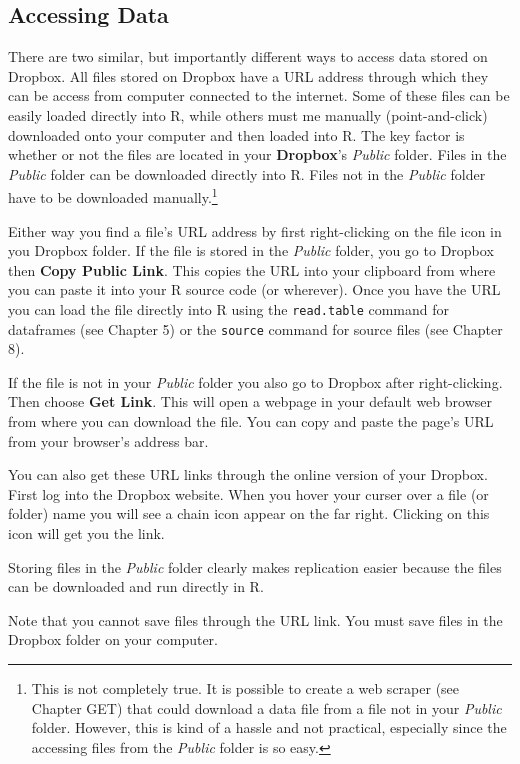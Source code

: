 \documentclass[ChapterTOCs,krantz1]{krantz}\usepackage{graphicx, color}
\begin{document}
{{\subsection{Accessing Data}

There are two similar, but importantly different ways to access data
stored on Dropbox. All files stored on Dropbox have a
URL address through which they can be access from computer connected to
the internet. Some of these files can be easily loaded directly into
R, while others must me manually (point-and-click) downloaded
onto your computer and then loaded into R. The key factor is
whether or not the files are located in your \textbf{Dropbox}'s
\emph{Public} folder. Files in the \emph{Public} folder can be
downloaded directly into R. Files not in the \emph{Public} folder
have to be downloaded manually.\footnote{This is not completely true. It
  is possible to create a web scraper (see Chapter GET) that could
  download a data file from a file not in your \emph{Public} folder.
  However, this is kind of a hassle and not practical, especially since
  the accessing files from the \emph{Public} folder is so easy.}

Either way you find a file's URL address by first right-clicking on the
file icon in you Dropbox folder. If the file is stored in the
\emph{Public} folder, you go to Dropbox then \textbf{Copy
Public Link}. This copies the URL into your clipboard from where you can
paste it into your R source code (or wherever). Once you have
the URL you can load the file directly into R using the
\texttt{read.table} command for dataframes (see Chapter 5) or the \texttt{source}
command for source files (see Chapter 8).

If the file is not in your \emph{Public} folder you also go to
Dropbox after right-clicking. Then choose \textbf{Get Link}.
This will open a webpage in your default web browser from where you can
download the file. You can copy and paste the page's URL from your
browser's address bar.

You can also get these URL links through the online version of your
Dropbox. First log into the Dropbox website. When you
hover your curser over a file (or folder) name you will see a chain icon
appear on the far right. Clicking on this icon will get you the link.

Storing files in the \emph{Public} folder clearly makes replication
easier because the files can be downloaded and run directly in
R.

Note that you cannot save files through the URL link. You must save
files in the Dropbox folder on your computer.

}}
\end{document}
